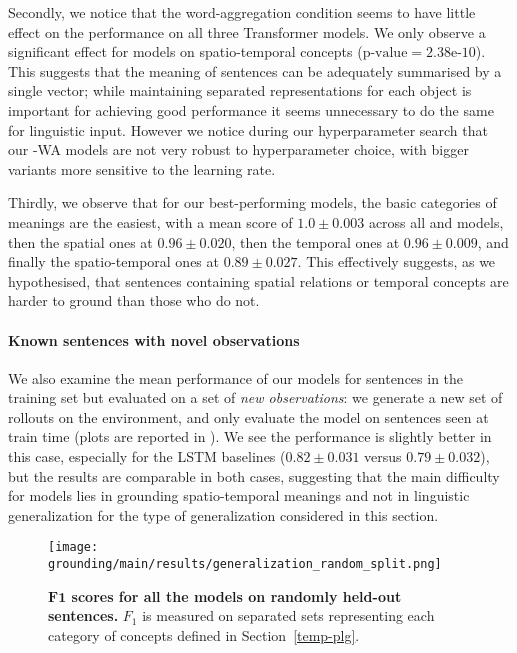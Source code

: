 Secondly, we notice that the word-aggregation condition seems to have little effect on the performance on all three Transformer models. We only observe a significant effect for \utm models on spatio-temporal concepts ($\text{p-value}=2.38\text{e-10}$). This suggests that the meaning of sentences can be adequately summarised by a single vector; while maintaining separated representations for each object is important for achieving good performance it seems unnecessary to do the same for linguistic input. However we notice during our hyperparameter search that our \textsc{-WA} models are not very robust to hyperparameter choice, with bigger variants more sensitive to the learning rate.

Thirdly, we observe that for our best-performing models, the basic categories of meanings are the easiest, with a mean score of $1.0 \pm 0.003$ across all \utm and \ttm models, then the spatial ones at $0.96 \pm 0.020$, then the temporal ones at $0.96 \pm 0.009$, and finally the spatio-temporal ones at $0.89 \pm 0.027$. This effectively suggests, as we hypothesised, that sentences containing spatial relations or temporal concepts are harder to ground than those who do not.

\paragraph{Known sentences with novel observations} 

We also examine the mean performance of our models for sentences in the training set but evaluated on a set of \textit{new observations}: we generate a new set of rollouts on the environment, and only evaluate the model on sentences seen at train time (plots are reported in ). We see the performance is slightly better in this case, especially for the LSTM baselines ($0.82 \pm 0.031$ versus $0.79 \pm 0.032$), but the results are comparable in both cases, suggesting that the main difficulty for models lies in grounding spatio-temporal meanings and not in linguistic generalization for the type of generalization considered in this section.


\begin{figure}[ht]
\centering
\texttt{[image: grounding/main/results/generalization\_random\_split.png]}
\caption{\textbf{$\mathbf{F1}$ scores for all the models on randomly held-out sentences.} $F_1$ is measured on separated sets representing each category of concepts defined in Section~\ref{temp-plg}.}
\label{fig:res_random_split}
\end{figure}


